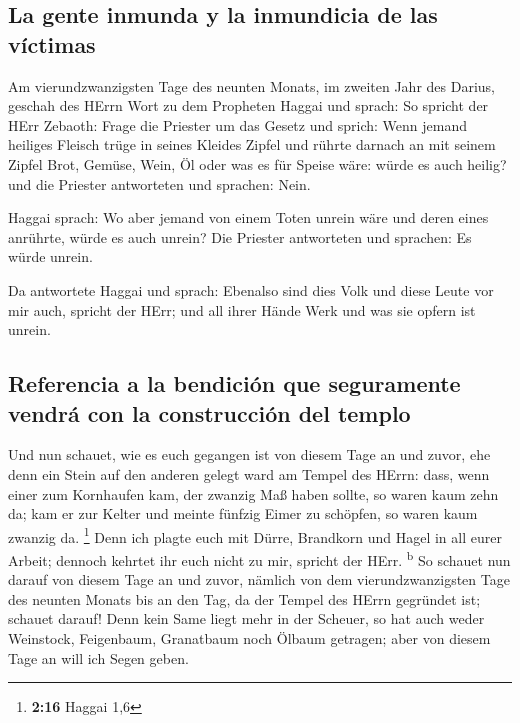 \hypertarget{la-gente-inmunda-y-la-inmundicia-de-las-vuxedctimas}{%
\subsection{La gente inmunda y la inmundicia de las
víctimas}\label{la-gente-inmunda-y-la-inmundicia-de-las-vuxedctimas}}

 Am vierundzwanzigsten Tage des neunten Monats, im
zweiten Jahr des Darius, geschah des HErrn Wort zu dem Propheten Haggai
und sprach:  So spricht der HErr Zebaoth: Frage die
Priester um das Gesetz und sprich:  Wenn jemand heiliges
Fleisch trüge in seines Kleides Zipfel und rührte darnach an mit seinem
Zipfel Brot, Gemüse, Wein, Öl oder was es für Speise wäre: würde es auch
heilig? und die Priester antworteten und sprachen: Nein.

 Haggai sprach: Wo aber jemand von einem Toten unrein
wäre und deren eines anrührte, würde es auch unrein? Die Priester
antworteten und sprachen: Es würde unrein.

 Da antwortete Haggai und sprach: Ebenalso sind dies Volk
und diese Leute vor mir auch, spricht der HErr; und all ihrer Hände Werk
und was sie opfern ist unrein.

\hypertarget{referencia-a-la-bendiciuxf3n-que-seguramente-vendruxe1-con-la-construcciuxf3n-del-templo}{%
\subsection{Referencia a la bendición que seguramente vendrá con la
construcción del
templo}\label{referencia-a-la-bendiciuxf3n-que-seguramente-vendruxe1-con-la-construcciuxf3n-del-templo}}

 Und nun schauet, wie es euch gegangen ist von diesem
Tage an und zuvor, ehe denn ein Stein auf den anderen gelegt ward am
Tempel des HErrn:  dass, wenn einer zum Kornhaufen kam,
der zwanzig Maß haben sollte, so waren kaum zehn da; kam er zur Kelter
und meinte fünfzig Eimer zu schöpfen, so waren kaum zwanzig da.
\footnote{\textbf{2:16} Haggai 1,6}  Denn ich plagte euch
mit Dürre, Brandkorn und Hagel in all eurer Arbeit; dennoch kehrtet ihr
euch nicht zu mir, spricht der HErr. \textsuperscript{b} 
So schauet nun darauf von diesem Tage an und zuvor, nämlich von dem
vierundzwanzigsten Tage des neunten Monats bis an den Tag, da der Tempel
des HErrn gegründet ist; schauet darauf!  Denn kein Same
liegt mehr in der Scheuer, so hat auch weder Weinstock, Feigenbaum,
Granatbaum noch Ölbaum getragen; aber von diesem Tage an will ich Segen
geben.

